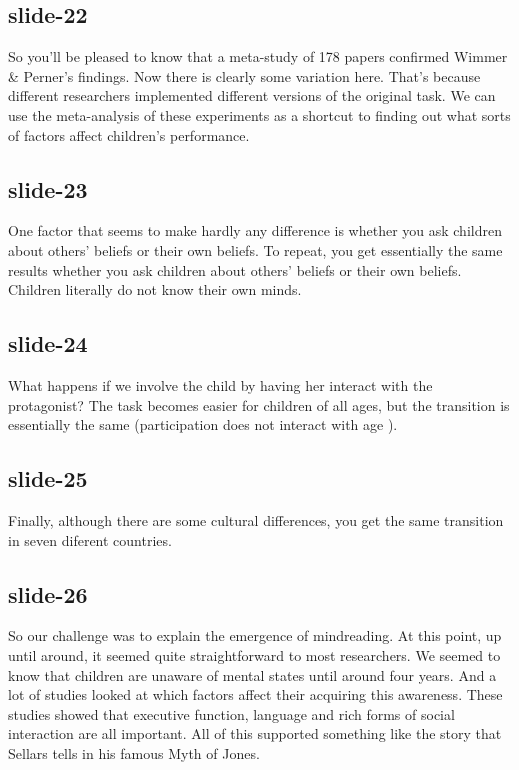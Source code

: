 \documentclass[12pt,\papersize]{extarticle}
\begin{document}
 
\subsection{slide-22}
So you'll be pleased to know that a meta-study of 178 papers confirmed Wimmer \& Perner's findings.
Now there is clearly some variation here.
That's because different researchers implemented different versions of the original task.
We can use the meta-analysis of these experiments as a shortcut to finding out what sorts of factors affect children's performance.
 
 
\subsection{slide-23}
One factor that seems to make hardly any difference is whether you ask children about others' beliefs or their own beliefs.
To repeat, you get essentially the same results whether you ask children about others' beliefs or their own beliefs.
Children literally do not know their own minds.
 
 
\subsection{slide-24}
What happens if we involve the child by having her interact with the protagonist?
The task becomes easier for children of all ages, but the transition is essentially the same (participation does not interact with age \citealp[pp.\ 665-7]{Wellman:2001lz}).
 
 
\subsection{slide-25}
Finally, although there are some cultural differences, you get the same transition in seven diferent countries.
 
 
\subsection{slide-26}
So our challenge was to explain the emergence of mindreading.
At this point, up until around, it seemed quite straightforward to most researchers.
We seemed to know that children are unaware of mental states until around four years.
And a lot of studies looked at which factors affect their acquiring this awareness.
These studies showed that executive function, language and rich forms of social interaction are all important.
All of this supported something like the story that Sellars tells in his famous Myth of Jones.
 
\end{document}
